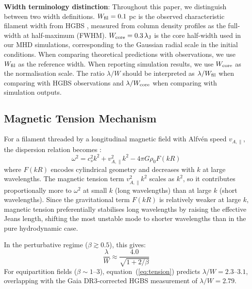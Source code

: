 \documentclass[twoside,twocolumn]{mnras}
\begin{document}
\textbf{Width terminology distinction}: Throughout this paper, we distinguish between two width definitions. $W_{\rm fil} = 0.1$ pc is the observed characteristic filament width from HGBS \citep{Arzoumanian2011}, measured from column density profiles as the full-width at half-maximum (FWHM). $W_{\rm core} = 0.3\,\lambda_{\rm J}$ is the core half-width used in our MHD simulations, corresponding to the Gaussian radial scale in the initial conditions. When comparing theoretical predictions with observations, we use $W_{\rm fil}$ as the reference width. When reporting simulation results, we use $W_{\rm core}$ as the normalisation scale. The ratio $\lambda/W$ should be interpreted as $\lambda/W_{\rm fil}$ when comparing with HGBS observations and $\lambda/W_{\rm core}$ when comparing with simulation outputs.

\subsection{Magnetic Tension Mechanism}

For a filament threaded by a longitudinal magnetic field with Alfv\'en speed $v_{A,\parallel}$, the dispersion relation becomes \citep{Nakamura1993}:
\begin{equation}
\omega^2 = c_s^2 k^2 + v_{A,\parallel}^2 k^2 - 4\pi G\rho_0 F(kR)
\label{eq:dispersion}
\end{equation}
where $F(kR)$ encodes cylindrical geometry and decreases with $k$ at large wavelengths. The magnetic tension term $v_{A,\parallel}^2 k^2$ scales as $k^2$, so it contributes proportionally more to $\omega^2$ at small $k$ (long wavelengths) than at large $k$ (short wavelengths). Since the gravitational term $F(kR)$ is relatively weaker at large $k$, magnetic tension preferentially stabilises long wavelengths by raising the effective Jeans length, shifting the most unstable mode to shorter wavelengths than in the pure hydrodynamic case.

In the perturbative regime ($\beta \gtrsim 0.5$), this gives:
\begin{equation}
\frac{\lambda}{W} \approx \frac{4.0}{\sqrt{1 + 2/\beta}}
\label{eq:tension}
\end{equation}
For equipartition fields ($\beta \sim 1$--$3$), equation~(\ref{eq:tension}) predicts $\lambda/W = 2.3$--$3.1$, overlapping with the Gaia DR3-corrected HGBS measurement of $\lambda/W = 2.79$.
\end{document}
